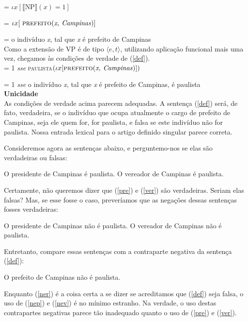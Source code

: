 \n = $\iota x[\llbracket \text{NP} \rrbracket(x)=1]$

\n = $\iota x[\ \text{\textsc{prefeito}(\textit{x, Campinas})}]$

\n = o indivíduo \textit{x}, tal que \textit{x} é prefeito de
Campinas\\

\n Como a extensão de VP é de tipo $\langle e,t\rangle$,
utilizando aplicação funcional mais uma vez, chegamos às condições
de verdade de (\ref{def}).\\

\n \den{(\ref{def})} = 1 \textit{sse} \textsc{paulista}$(\iota x[  \text{\textsc{prefeito}(\textit{x, Campinas})}]) $

\n \den{(\ref{def})} = 1 \textit{sse} o indivíduo \textit{x}, tal
que \textit{x} é prefeito de Campinas, é paulista\\

\n \textbf{Unicidade}\\

\n As condições de verdade acima parecem adequadas. A sentença
(\ref{def}) será, de fato, verdadeira, se o indivíduo que ocupa
atualmente o cargo de prefeito de Campinas, seja ele quem for, for
paulista, e falsa se este indivíduo não for paulista. Nossa
entrada lexical para o artigo definido singular parece correta.

Consideremos agora as sentenças abaixo, e perguntemo-nos se elas
são verdadeiras ou falsas:

\begin{exe}
\ex O presidente de Campinas é paulista.\label{pre}
\ex O vereador de Campinas é paulista.\label{ver}
\end{exe}

Certamente, não queremos dizer que (\ref{pre}) e (\ref{ver}) são
verdadeiras. Seriam elas falsas? Mas, se esse fosse o caso,
preveríamos que as negações dessas sentenças fosses verdadeiras:

\begin{exe}
\ex O presidente de Campinas não é paulista.\label{nep}
\ex O vereador de Campinas não é paulista.\label{nev}
\end{exe}

Entretanto, compare essas sentenças com a contraparte negativa da
sentença (\ref{def}):

\begin{exe}
\ex O prefeito de Campinas não é paulista.\label{ner}
\end{exe}

Enquanto (\ref{ner}) é a coisa certa a se dizer se acreditamos que
(\ref{def}) seja falsa, o uso de (\ref{nep}) e (\ref{nev}) é no
mínimo estranho. Na verdade, o uso destas contrapartes negativas
parece tão inadequado quanto o uso de (\ref{pre}) e (\ref{ver}).


